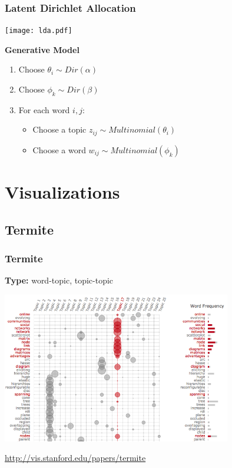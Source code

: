 \documentclass[t]{beamer}
\begin{document}
\begin{frame}
\frametitle{Latent Dirichlet Allocation}

\texttt{[image: lda.pdf]}
\bigskip

\textbf{Generative Model}
\begin{enumerate}
\item Choose $\theta_i \sim Dir(\alpha)$
\pause
\item Choose $\phi_k \sim Dir(\beta)$
\pause
\item For each word $i, j$:
    \begin{itemize}
    \item Choose a topic $z_{ij} \sim Multinomial(\theta_i)$
    \item Choose a word $w_{ij} \sim Multinomial(\phi_k)$
    \end{itemize}
\end{enumerate}

\cite{Blei2003}
\end{frame}

\section{Visualizations}
\subsection{Termite}
\begin{frame}
\frametitle{Termite}
\textbf{Type:} word-topic, topic-topic

\includegraphics[width=0.75\textwidth]{img/termite.png}

\url{http://vis.stanford.edu/papers/termite}

\cite{Chuang2012}
\end{frame}
\end{document}
